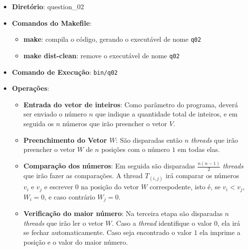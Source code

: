 \begin{itemize}
	\item{\textbf{Diretório}: question\_02}
	\item{\textbf{Comandos do Makefile}:
	\begin{itemize}
		\item{\textbf{make}: compila o código, gerando o executável de nome \texttt{q02}}
		\item{\textbf{make dist-clean}: remove o executável de nome \texttt{q02}}
	\end{itemize}}
	\item{\textbf{Comando de Execução}: \texttt{bin/q02}}
	\item{\textbf{Operações}:
	\begin{itemize}
		\item{\textbf{Entrada do vetor de inteiros}: Como parâmetro do programa, deverá ser enviado o número $n$ que indique a quantidade total de inteiros, e em seguida os $n$ números que irão preencher o vetor $V$.}
		\item{\textbf{Preenchimento do Vetor $W$}: São disparadas então $n$ \emph{threads} que irão preencher o vetor $W$ de $n$ posições com o número $1$ em todas elas.}
		\item{\textbf{Comparação dos números}: Em seguida são disparadas $\frac{n(n-1)}{2}$ \emph{threads} que irão fazer as comparações. A thread $T_{(i,j)}$ irá comparar os números $v_{i}$ e $v_{j}$ e escrever $0$ na posição do vetor $W$ correspodente, isto é, se $v_{i} < v_{j}$, $W_{i} = 0$, e caso contrário $W_{j} = 0$.}
		\item{\textbf{Verificação do maior número}: Na terceira etapa são disparadas $n$ \emph{threads} que irão ler o vetor $W$. Caso a \emph{thread} identifique o valor $0$, ela irá se fechar automaticamente. Caso seja encontrado o valor $1$ ela imprime a posição e o valor do maior número.}
	\end{itemize}}
\end{itemize}
